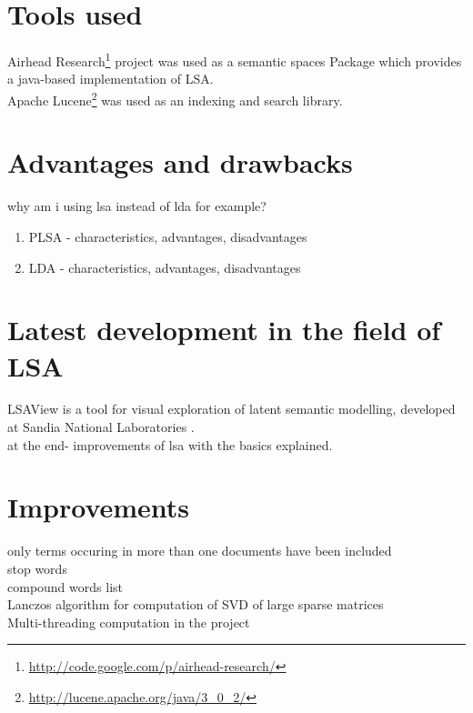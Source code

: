 \section{Tools used}
\label{sec:implementation:tools_used}
Airhead Research\footnote{\url{http://code.google.com/p/airhead-research/}} project was used as a semantic spaces Package which provides a java-based implementation of \gls{LSA}.\\

Apache Lucene\footnote{\url{http://lucene.apache.org/java/3_0_2/}} was used as an indexing and search library.

\section{Advantages and drawbacks}
\label{sec:lsa:adv_disadv}

why am i using lsa instead of lda for example?\\

\begin{enumerate}
\item PLSA - characteristics, advantages, disadvantages
\item LDA - characteristics, advantages, disadvantages
\end{enumerate}

\section{Latest development in the field of LSA}
\label{sec:lsa:latest}
LSAView is a tool for visual exploration of latent semantic modelling, developed at Sandia National Laboratories \cite{CrDuSh09}.\\

at the end- improvements of lsa with the basics explained.\\

\section{Improvements}
only terms occuring in more than one documents have been included \\
stop words \\
compound words list \\
Lanczos algorithm for computation of SVD of large sparse matrices \\
Multi-threading computation in the project \\


